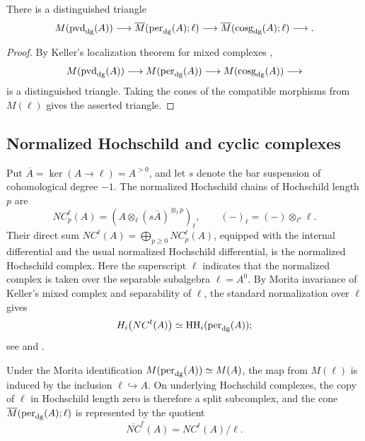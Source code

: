 \documentclass[11pt,a4paper,dvipsnames,x11names]{amsart}
\begin{document}
\begin{prop}\label{prop:reduced-localization}
There is a distinguished triangle
\[
M(\operatorname{pvd}_{\mathrm{dg}}(A))\longrightarrow\overline M(\operatorname{per}_{\mathrm{dg}}(A);\ell)\longrightarrow\overline M(\operatorname{cosg}_{\mathrm{dg}}(A);\ell)\longrightarrow.
\]
\end{prop}

\begin{proof}
By Keller's localization theorem for mixed complexes \cite[Theorem~1.5]{Keller99},
\[
M(\operatorname{pvd}_{\mathrm{dg}}(A))\longrightarrow M(\operatorname{per}_{\mathrm{dg}}(A))\longrightarrow M(\operatorname{cosg}_{\mathrm{dg}}(A))\longrightarrow
\]
is a distinguished triangle. Taking the cones of the compatible morphisms from $M(\ell)$ gives the asserted triangle.
\end{proof}

\subsection{Normalized Hochschild and cyclic complexes}

Put $\overline A=\ker(A\to\ell)=A^{>0}$, and let $s$ denote the bar suspension of cohomological degree $-1$. The normalized Hochschild chains of Hochschild length $p$ are
\[
NC_p^{\ell}(A)=\left(A\otimes_{\ell}(s\overline A)^{\otimes_{\ell}p}\right)_{\ell},
\qquad
(-)_{\ell}=(-)\otimes_{\ell^e}\ell.
\]
Their direct sum $NC^{\ell}(A)=\bigoplus_{p\geq0}NC_p^{\ell}(A)$, equipped with the internal differential and the usual normalized Hochschild differential, is the normalized Hochschild complex. Here the superscript $\ell$ indicates that the normalized complex is taken over the separable subalgebra $\ell=A^0$. By Morita invariance of Keller's mixed complex and separability of $\ell$, the standard normalization over $\ell$ gives
\begin{equation}\label{eq:relative-HH-model}
H_i\bigl(NC^{\ell}(A)\bigr)\simeq\operatorname{HH}_i(\operatorname{per}_{\mathrm{dg}}(A));
\end{equation}
see \cite{Keller99} and \cite[Chapter~1]{Loday98}.

Under the Morita identification $M(\operatorname{per}_{\mathrm{dg}}(A))\simeq M(A)$, the map from $M(\ell)$ is induced by the inclusion $\ell\hookrightarrow A$. On underlying Hochschild complexes, the copy of $\ell$ in Hochschild length zero is therefore a split subcomplex, and the cone $\overline M(\operatorname{per}_{\mathrm{dg}}(A);\ell)$ is represented by the quotient
\[
\overline{NC}^{\ell}(A)=NC^{\ell}(A)/\ell.
\]
\end{document}
